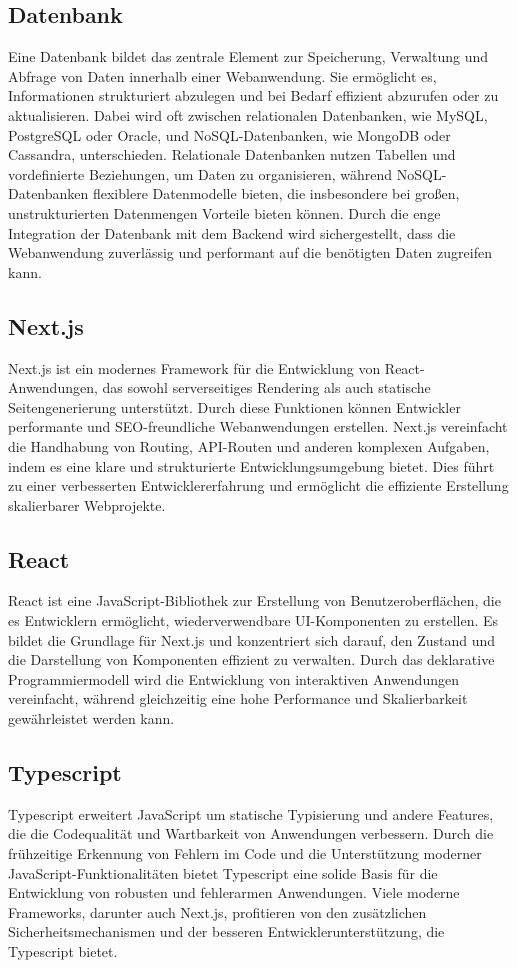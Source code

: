 \begin{inhalt}
\subsection{Datenbank}

Eine Datenbank \cite{DatenBank} bildet das zentrale Element zur Speicherung, Verwaltung und Abfrage von Daten innerhalb einer Webanwendung. Sie ermöglicht es, Informationen strukturiert abzulegen und bei Bedarf effizient abzurufen oder zu aktualisieren. Dabei wird oft zwischen relationalen Datenbanken, wie MySQL, PostgreSQL oder Oracle, und NoSQL-Datenbanken, wie MongoDB oder Cassandra, unterschieden. Relationale Datenbanken nutzen Tabellen und vordefinierte Beziehungen, um Daten zu organisieren, während NoSQL-Datenbanken flexiblere Datenmodelle bieten, die insbesondere bei großen, unstrukturierten Datenmengen Vorteile bieten können. Durch die enge Integration der Datenbank mit dem Backend wird sichergestellt, dass die Webanwendung zuverlässig und performant auf die benötigten Daten zugreifen kann.

\subsection{Next.js}
Next.js \cite{NextJS} ist ein modernes Framework für die Entwicklung von React-Anwendungen, das sowohl serverseitiges Rendering als auch statische Seitengenerierung unterstützt. Durch diese Funktionen können Entwickler performante und SEO-freundliche Webanwendungen erstellen. Next.js vereinfacht die Handhabung von Routing, API-Routen und anderen komplexen Aufgaben, indem es eine klare und strukturierte Entwicklungsumgebung bietet. Dies führt zu einer verbesserten Entwicklererfahrung und ermöglicht die effiziente Erstellung skalierbarer Webprojekte.

\subsection{React}
React \cite{React} ist eine JavaScript-Bibliothek zur Erstellung von Benutzeroberflächen, die es Entwicklern ermöglicht, wiederverwendbare UI-Komponenten zu erstellen. Es bildet die Grundlage für Next.js und konzentriert sich darauf, den Zustand und die Darstellung von Komponenten effizient zu verwalten. Durch das deklarative Programmiermodell wird die Entwicklung von interaktiven Anwendungen vereinfacht, während gleichzeitig eine hohe Performance und Skalierbarkeit gewährleistet werden kann.

\subsection{Typescript}
Typescript \cite{Typescript} erweitert JavaScript um statische Typisierung und andere Features, die die Codequalität und Wartbarkeit von Anwendungen verbessern. Durch die frühzeitige Erkennung von Fehlern im Code und die Unterstützung moderner JavaScript-Funktionalitäten bietet Typescript eine solide Basis für die Entwicklung von robusten und fehlerarmen Anwendungen. Viele moderne Frameworks, darunter auch Next.js, profitieren von den zusätzlichen Sicherheitsmechanismen und der besseren Entwicklerunterstützung, die Typescript bietet.


\end{inhalt}
